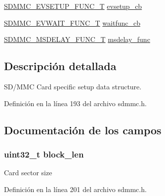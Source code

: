 \begin{DoxyCompactItemize}
\item 
\hyperlink{group___c_h_i_p___s_d_m_m_c___definitions_gad8f6b6485a8de8a55a8cdee88788a64c}{S\+D\+M\+M\+C\+\_\+\+E\+V\+S\+E\+T\+U\+P\+\_\+\+F\+U\+N\+C\+\_\+T} \hyperlink{struct_s_d_m_m_c___c_a_r_d___t_a863f41c39cc6b5316fa1ae19f30116a8}{evsetup\+\_\+cb}
\item 
\hyperlink{group___c_h_i_p___s_d_m_m_c___definitions_ga3379c3596d02e20e0531dc1287df505f}{S\+D\+M\+M\+C\+\_\+\+E\+V\+W\+A\+I\+T\+\_\+\+F\+U\+N\+C\+\_\+T} \hyperlink{struct_s_d_m_m_c___c_a_r_d___t_aba83ee702d85b5e9dc7f00a9561a200c}{waitfunc\+\_\+cb}
\item 
\hyperlink{group___c_h_i_p___s_d_m_m_c___definitions_ga910711513843f370e9b251ec60b245e7}{S\+D\+M\+M\+C\+\_\+\+M\+S\+D\+E\+L\+A\+Y\+\_\+\+F\+U\+N\+C\+\_\+T} \hyperlink{struct_s_d_m_m_c___c_a_r_d___t_aef75c297850362bd49b19f70475f7bad}{msdelay\+\_\+func}
\end{DoxyCompactItemize}


\subsection{Descripción detallada}
S\+D/\+M\+MC Card specific setup data structure. 

Definición en la línea 193 del archivo sdmmc.\+h.



\subsection{Documentación de los campos}
\subsubsection[{\texorpdfstring{block\+\_\+len}{block_len}}]{\setlength{\rightskip}{0pt plus 5cm}uint32\+\_\+t block\+\_\+len}\hypertarget{struct_s_d_m_m_c___c_a_r_d___t_a8fb8b36eb880c86464ec8baf1b5c202a}{}\label{struct_s_d_m_m_c___c_a_r_d___t_a8fb8b36eb880c86464ec8baf1b5c202a}
Card sector size 

Definición en la línea 201 del archivo sdmmc.\+h.


